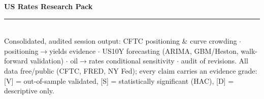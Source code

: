 \documentclass[10pt,a4paper]{article}
\newcommand{\grade}[1]{{\footnotesize\color{biggrey}[#1]}}
\begin{document}
\begin{center}
{\LARGE\textbf{\color{biggrey}US Rates Research Pack}}\\[3pt]
{\color{bigorange}\rule{\textwidth}{2.5pt}}\\[3pt]
{\small Consolidated, audited session output: CFTC positioning \& curve crowding
$\cdot$ positioning$\to$yields evidence $\cdot$ US10Y forecasting (ARIMA, GBM/Heston,
walk-forward validation) $\cdot$ oil$\to$rates conditional sensitivity $\cdot$
audit of revisions. All data free/public (CFTC, FRED, NY Fed); every claim carries an
evidence grade: \grade{V} = out-of-sample validated, \grade{S} = statistically significant
(HAC), \grade{D} = descriptive only.}
\end{center}
\end{document}
